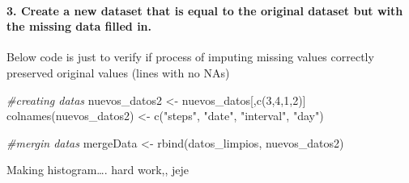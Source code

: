 \documentclass[
]{article}
\newenvironment{Shaded}{\begin{snugshade}}{\end{snugshade}}
\newcommand{\AttributeTok}[1]{\textcolor[rgb]{0.77,0.63,0.00}{#1}}
\newcommand{\CommentTok}[1]{\textcolor[rgb]{0.56,0.35,0.01}{\textit{#1}}}
\newcommand{\DecValTok}[1]{\textcolor[rgb]{0.00,0.00,0.81}{#1}}
\newcommand{\FunctionTok}[1]{\textcolor[rgb]{0.00,0.00,0.00}{#1}}
\newcommand{\NormalTok}[1]{#1}
\newcommand{\OtherTok}[1]{\textcolor[rgb]{0.56,0.35,0.01}{#1}}
\newcommand{\SpecialCharTok}[1]{\textcolor[rgb]{0.00,0.00,0.00}{#1}}
\newcommand{\StringTok}[1]{\textcolor[rgb]{0.31,0.60,0.02}{#1}}
\begin{document}
\hypertarget{create-a-new-dataset-that-is-equal-to-the-original-dataset-but-with-the-missing-data-filled-in.}{%
\paragraph{3. Create a new dataset that is equal to the original dataset
but with the missing data filled
in.}\label{create-a-new-dataset-that-is-equal-to-the-original-dataset-but-with-the-missing-data-filled-in.}}

Below code is just to verify if process of imputing missing values
correctly preserved original values (lines with no NAs)

\begin{Shaded}
\begin{Highlighting}[]
\CommentTok{\#creating datas}
\NormalTok{nuevos\_datos2 }\OtherTok{\textless{}{-}}\NormalTok{ nuevos\_datos[,}\FunctionTok{c}\NormalTok{(}\DecValTok{3}\NormalTok{,}\DecValTok{4}\NormalTok{,}\DecValTok{1}\NormalTok{,}\DecValTok{2}\NormalTok{)]}
\FunctionTok{colnames}\NormalTok{(nuevos\_datos2) }\OtherTok{\textless{}{-}} \FunctionTok{c}\NormalTok{(}\StringTok{"steps"}\NormalTok{, }\StringTok{"date"}\NormalTok{, }\StringTok{"interval"}\NormalTok{, }\StringTok{"day"}\NormalTok{)}

\CommentTok{\#mergin datas}
\NormalTok{mergeData }\OtherTok{\textless{}{-}} \FunctionTok{rbind}\NormalTok{(datos\_limpios, nuevos\_datos2)}
\end{Highlighting}
\end{Shaded}

Making histogram\ldots. hard work,, jeje

\begin{Shaded}
\end{Shaded}
\end{document}
